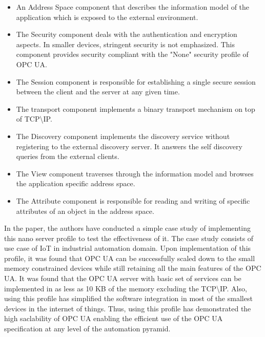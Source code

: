 \documentclass[conference]{IEEEtran}
\begin{document}
\begin{itemize}
\item An Address Space component that describes the information model of the application which is exposed to the external environment.

\item The Security component deals with the authentication and encryption aspects. In smaller devices, stringent security is not emphasized. This component provides security compliant with the "None" security profile of OPC UA.

\item The Session component is responsible for establishing a single secure session between the client and the server at any given time.

\item The transport component implements a binary transport mechanism on top of TCP\textbackslash IP.

\item The Discovery component implements the discovery service without registering to the external discovery server. It answers the self discovery queries from the external clients.

\item The View component traverses through the information model and browses the application specific address space.

\item The Attribute component is responsible for reading and writing of specific attributes of an object in the address space.
\end{itemize}

In the paper, the authors have conducted a simple case study of implementing this nano server profile to test the effectiveness of it. The case study consists of use case of IoT in industrial automation domain.\cite{6622935}
Upon implementation of this profile, it was found that OPC UA can be successfully scaled down to the small memory constrained devices while still retaining all the main features of the OPC UA.
It was found that the OPC UA server with basic set of services can be implemented in as less as 10 KB of the memory excluding the TCP\textbackslash IP.
Also, using this profile has simplified the software integration  in most of the smallest devices in the internet of things. Thus, using this profile has demonstrated the high saclability of OPC UA enabling the efficient use of the OPC UA specification at any level of the automation pyramid.
\end{document}
